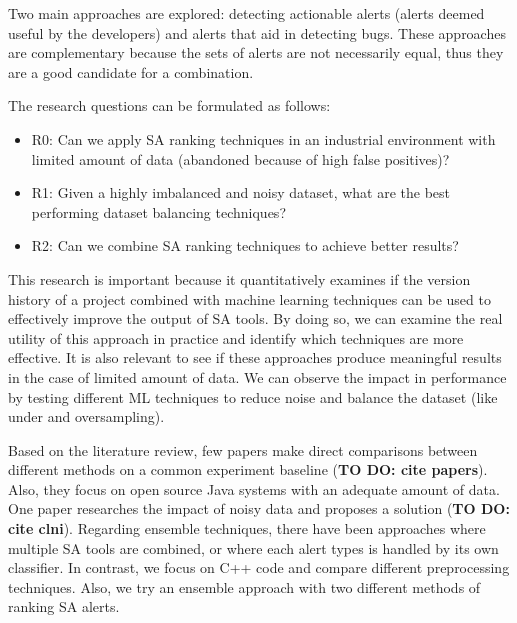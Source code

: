 Two main approaches are explored: detecting actionable alerts (alerts deemed useful by the developers) and alerts that aid in detecting bugs. These approaches are complementary because the sets of alerts are not necessarily equal, thus they are a good candidate for a combination.

The research questions can be formulated as follows:
\begin{itemize}
    \item R0: Can we apply SA ranking techniques in an industrial environment with limited amount of data (abandoned because of high false positives)?
    \item R1: Given a highly imbalanced and noisy dataset, what are the best performing dataset balancing techniques?
    \item R2: Can we combine SA ranking techniques to achieve better results?
\end{itemize}

This research is important because it quantitatively examines if the version history of a project combined with machine learning techniques can be used to effectively improve the output of SA tools. By doing so, we can examine the real utility of this approach in practice and identify which techniques are more effective. It is also relevant to see if these approaches produce meaningful results in the case of limited amount of data. We can observe the impact in performance by testing different ML techniques to reduce noise and balance the dataset (like under and oversampling). 

Based on the literature review, few papers make direct comparisons between different methods on a common experiment baseline (\textbf{TO DO: cite papers}). Also, they focus on open source Java systems with an adequate amount of data. One paper researches the impact of noisy data and proposes a solution (\textbf{TO DO: cite clni}). Regarding ensemble techniques, there have been approaches where multiple SA tools are combined, or where each alert types is handled by its own classifier. In contrast, we focus on C++ code and compare different preprocessing techniques. Also, we try an ensemble approach with two different methods of ranking SA alerts.
